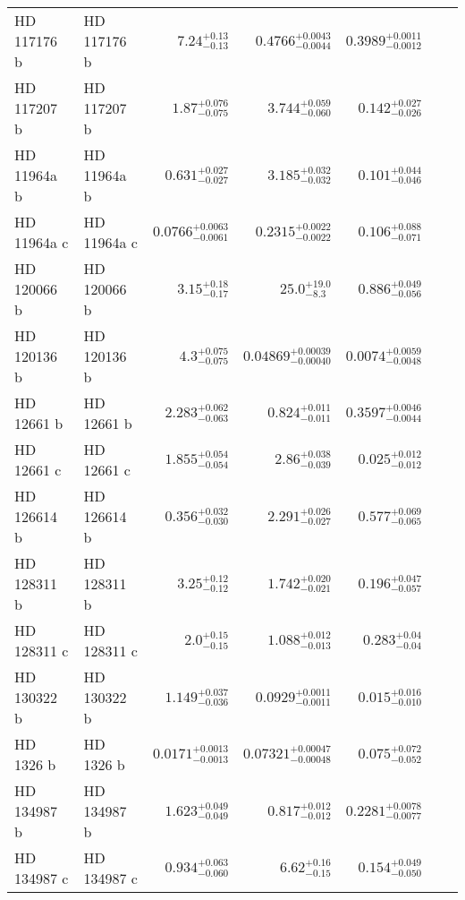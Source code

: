 \begin{longtable*}{llrrrrr}
HD 117176 b & HD 117176 b & $7.24^{+0.13}_{-0.13}$ & $0.4766^{+0.0043}_{-0.0044}$ & $0.3989^{+0.0011}_{-0.0012}$ & \cite{Naef04} & \\ 
HD 117207 b & HD 117207 b & $1.87^{+0.076}_{-0.075}$ & $3.744^{+0.059}_{-0.060}$ & $0.142^{+0.027}_{-0.026}$ & \cite{Marcy05} & \\ 
HD 11964a b & HD 11964a b & $0.631^{+0.027}_{-0.027}$ & $3.185^{+0.032}_{-0.032}$ & $0.101^{+0.044}_{-0.046}$ & \cite{Butler06} & \\ 
HD 11964a c & HD 11964a c & $0.0766^{+0.0063}_{-0.0061}$ & $0.2315^{+0.0022}_{-0.0022}$ & $0.106^{+0.088}_{-0.071}$ & \cite{Wright09} & \\ 
HD 120066 b & HD 120066 b & $3.15^{+0.18}_{-0.17}$ & $25.0^{+19.0}_{-8.3}$ & $0.886^{+0.049}_{-0.056}$ & \cite{Blunt19} & \\ 
HD 120136 b & HD 120136 b & $4.3^{+0.075}_{-0.075}$ & $0.04869^{+0.00039}_{-0.00040}$ & $0.0074^{+0.0059}_{-0.0048}$ & \cite{Butler97} & \\ 
HD 12661 b & HD 12661 b & $2.283^{+0.062}_{-0.063}$ & $0.824^{+0.011}_{-0.011}$ & $0.3597^{+0.0046}_{-0.0044}$ & \cite{Fischer01} & \\ 
HD 12661 c & HD 12661 c & $1.855^{+0.054}_{-0.054}$ & $2.86^{+0.038}_{-0.039}$ & $0.025^{+0.012}_{-0.012}$ & \cite{Butler06} & \\ 
HD 126614 b & HD 126614 b & $0.356^{+0.032}_{-0.030}$ & $2.291^{+0.026}_{-0.027}$ & $0.577^{+0.069}_{-0.065}$ & \cite{Howard10} & \\ 
HD 128311 b & HD 128311 b & $3.25^{+0.12}_{-0.12}$ & $1.742^{+0.020}_{-0.021}$ & $0.196^{+0.047}_{-0.057}$ & \cite{Butler03} & \\ 
HD 128311 c & HD 128311 c & $2.0^{+0.15}_{-0.15}$ & $1.088^{+0.012}_{-0.013}$ & $0.283^{+0.04}_{-0.04}$ & \cite{Vogt05} & \\ 
HD 130322 b & HD 130322 b & $1.149^{+0.037}_{-0.036}$ & $0.0929^{+0.0011}_{-0.0011}$ & $0.015^{+0.016}_{-0.010}$ & \cite{Udry00} & \\ 
HD 1326 b & HD 1326 b & $0.0171^{+0.0013}_{-0.0013}$ & $0.07321^{+0.00047}_{-0.00048}$ & $0.075^{+0.072}_{-0.052}$ & \cite{Howard14} & \\ 
HD 134987 b & HD 134987 b & $1.623^{+0.049}_{-0.049}$ & $0.817^{+0.012}_{-0.012}$ & $0.2281^{+0.0078}_{-0.0077}$ & \cite{Butler01} & \\ 
HD 134987 c & HD 134987 c & $0.934^{+0.063}_{-0.060}$ & $6.62^{+0.16}_{-0.15}$ & $0.154^{+0.049}_{-0.050}$ & \cite{Jones10} & \\ 

\end{longtable*}
